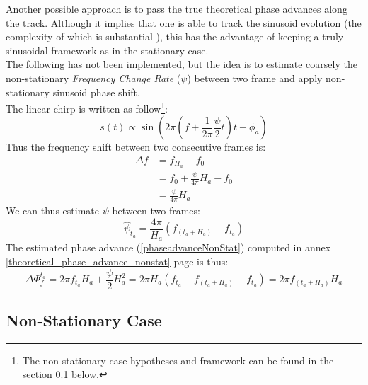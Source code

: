 \documentclass[]{article}
\begin{document}
Another possible approach is to pass the true theoretical phase advances along the track. Although it implies that one is able to track the sinusoid evolution (the complexity of which is substantial \cite{mcaulay1986speech, serra1989system, karrer2006phavorit}), this has the advantage of keeping a truly sinusoidal framework as in the stationary case.\\
The following has not been implemented, but the idea is to estimate coarsely the non-stationary \emph{Frequency Change Rate} ($\psi$) between two frame and apply non-stationary sinusoid phase shift.\\
The linear chirp is written as follow\footnote{The non-stationary case hypotheses and framework can be found in the section \ref{non-stationary-case} below.}:
\begin{equation}
s(t) \propto \sin\left(2\pi\left(f  + \frac{1}{2\pi}\frac{\psi}{2} t\right)t + \phi_a\right)
\end{equation}
Thus the frequency shift between two consecutive frames is:
\begin{equation}
\begin{split}
\Delta f & = f_{H_a} - f_0\\
& = f_0 + \frac{\psi}{4\pi}H_a - f_0\\
& = \frac{\psi}{4\pi}H_a
\end{split}
\end{equation}
We can thus estimate $\psi$ between two frames:
\begin{equation}
\hat{\psi}_{t_a} = \frac{4\pi}{H_a}\left(f_{(t_a + H_a)} - f_{t_a} \right)
\end{equation}
The estimated phase advance (\ref{phaseadvanceNonStat}) computed in annex \ref{theoretical_phase_advance_nonstat} page \pageref{theoretical_phase_advance_nonstat} is thus:
\begin{equation}
\Delta \Phi_{f}^{t_a} = 2\pi f_{t_a} H_a + \frac{\psi}{2}H_a^2 = 2\pi H_a\left(f_{t_a} + f_{(t_a + H_a)} - f_{t_a} \right) = 2\pi f_{(t_a + H_a)} H_a
\end{equation}
\subsection{Non-Stationary Case}\label{non-stationary-case}
\end{document}
